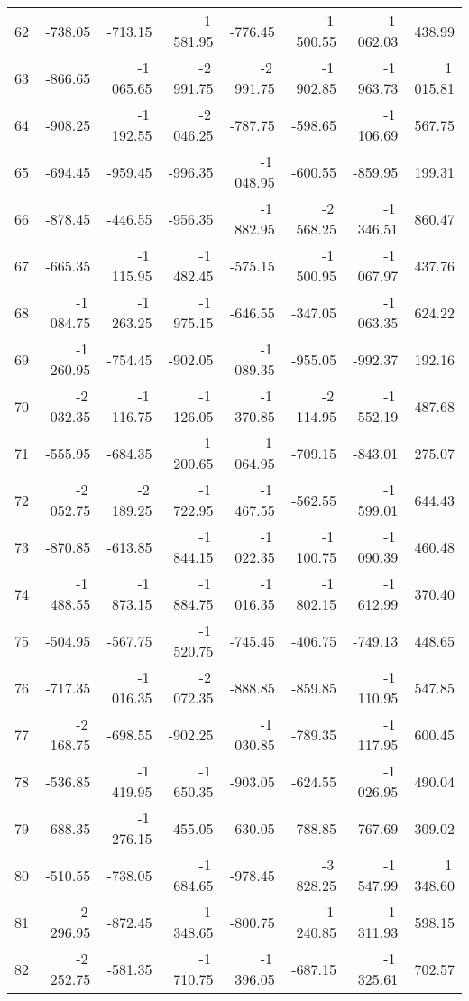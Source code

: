 \begin{longtable}{rrrrrrrr}
62 & -738.05 & -713.15 & -1\,581.95 & -776.45 & -1\,500.55 & -1\,062.03 & 438.99  \\
63 & -866.65 & -1\,065.65 & -2\,991.75 & -2\,991.75 & -1\,902.85 & -1\,963.73 & 1\,015.81  \\
64 & -908.25 & -1\,192.55 & -2\,046.25 & -787.75 & -598.65 & -1\,106.69 & 567.75  \\
65 & -694.45 & -959.45 & -996.35 & -1\,048.95 & -600.55 & -859.95 & 199.31  \\
66 & -878.45 & -446.55 & -956.35 & -1\,882.95 & -2\,568.25 & -1\,346.51 & 860.47  \\
67 & -665.35 & -1\,115.95 & -1\,482.45 & -575.15 & -1\,500.95 & -1\,067.97 & 437.76  \\
68 & -1\,084.75 & -1\,263.25 & -1\,975.15 & -646.55 & -347.05 & -1\,063.35 & 624.22  \\
69 & -1\,260.95 & -754.45 & -902.05 & -1\,089.35 & -955.05 & -992.37 & 192.16  \\
70 & -2\,032.35 & -1\,116.75 & -1\,126.05 & -1\,370.85 & -2\,114.95 & -1\,552.19 & 487.68  \\
71 & -555.95 & -684.35 & -1\,200.65 & -1\,064.95 & -709.15 & -843.01 & 275.07  \\
72 & -2\,052.75 & -2\,189.25 & -1\,722.95 & -1\,467.55 & -562.55 & -1\,599.01 & 644.43  \\
73 & -870.85 & -613.85 & -1\,844.15 & -1\,022.35 & -1\,100.75 & -1\,090.39 & 460.48  \\
74 & -1\,488.55 & -1\,873.15 & -1\,884.75 & -1\,016.35 & -1\,802.15 & -1\,612.99 & 370.40  \\
75 & -504.95 & -567.75 & -1\,520.75 & -745.45 & -406.75 & -749.13 & 448.65  \\
76 & -717.35 & -1\,016.35 & -2\,072.35 & -888.85 & -859.85 & -1\,110.95 & 547.85  \\
77 & -2\,168.75 & -698.55 & -902.25 & -1\,030.85 & -789.35 & -1\,117.95 & 600.45  \\
78 & -536.85 & -1\,419.95 & -1\,650.35 & -903.05 & -624.55 & -1\,026.95 & 490.04  \\
79 & -688.35 & -1\,276.15 & -455.05 & -630.05 & -788.85 & -767.69 & 309.02  \\
80 & -510.55 & -738.05 & -1\,684.65 & -978.45 & -3\,828.25 & -1\,547.99 & 1\,348.60  \\
81 & -2\,296.95 & -872.45 & -1\,348.65 & -800.75 & -1\,240.85 & -1\,311.93 & 598.15  \\
82 & -2\,252.75 & -581.35 & -1\,710.75 & -1\,396.05 & -687.15 & -1\,325.61 & 702.57  \\

\end{longtable}
